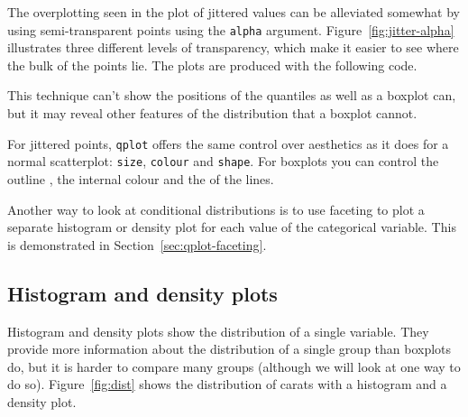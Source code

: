 The overplotting seen in the plot of jittered values can be alleviated somewhat by using semi-transparent points using the {\tt alpha} argument. Figure~\ref{fig:jitter-alpha} illustrates three different levels of transparency, which make it easier to see where the bulk of the points lie.  The plots are produced with the following code.

% 


This technique can't show the positions of the quantiles as well as a boxplot can, but it may reveal other features of the distribution that a boxplot cannot.

For jittered points, {\tt qplot} offers the same control over aesthetics as it does for a normal scatterplot: {\tt size}, {\tt colour} and {\tt shape}. For boxplots you can control the outline , the internal  colour and the  of the lines.

Another way to look at conditional distributions is to use faceting to plot a separate histogram or density plot for each value of the categorical variable.  This is demonstrated in Section~\ref{sec:qplot-faceting}.

\subsection{Histogram and density plots}\label{sub:distribution}

Histogram and density plots show the distribution of a single variable.  They provide more information about the distribution of a single group than boxplots do, but it is harder to compare many groups (although we will look at one way to do so).  Figure~\ref{fig:dist} shows the distribution of carats with a histogram and a density plot.

% 


